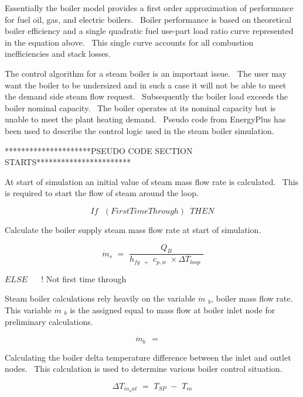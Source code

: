 Essentially the boiler model provides a first order approximation of performance for fuel oil, gas, and electric boilers.~ Boiler performance is based on theoretical boiler efficiency and a single quadratic fuel use-part load ratio curve represented in the equation above.~ This single curve accounts for all combustion inefficiencies and stack losses.

The control algorithm for a steam boiler is an important issue.~ The user may want the boiler to be undersized and in such a case it will not be able to meet the demand side steam flow request.~ Subsequently the boiler load exceeds the boiler nominal capacity.~ The boiler operates at its nominal capacity but is unable to meet the plant heating demand.~ Pseudo code from EnergyPlus has been used to describe the control logic used in the steam boiler simulation.

*********************PSEUDO CODE SECTION STARTS***********************

At start of simulation an initial value of steam mass flow rate is calculated.~ This is required to start the flow of steam around the loop.

\begin{equation}
If\,\,\,\,(FirstTimeThrough)\,\,\,THEN
\end{equation}

Calculate the boiler supply steam mass flow rate at start of simulation.

\begin{equation}
\,{\dot m_s}\,\, = \,\,\frac{{{Q_B}}}{{{h_{fg\,\,\, + }}\,\,{c_{p,w}}\,\, \times \Delta {T_{loop}}\,\,}}
\end{equation}

\(ELSE\) ~~ ! Not first time through

Steam boiler calculations rely heavily on the variable \(\dot m\) \(_{b}\), boiler mass flow rate.~ This variable \(\dot m\) \(_{b}\) is the assigned equal to mass flow at boiler inlet node for preliminary calculations.

\begin{equation}
\,{\dot m_b}\,\,\, = \,\,\,\mathop {\,{{\dot m}_{Inlet_Node}}}\limits^{}
\end{equation}

Calculating the boiler delta temperature difference between the inlet and outlet nodes.~ This calculation is used to determine various boiler control situation.

\begin{equation}
\Delta {T_{in_out}}\,\, = \,\,{T_{SP}}\,\, - \,\,{T_{in}}
\end{equation}

